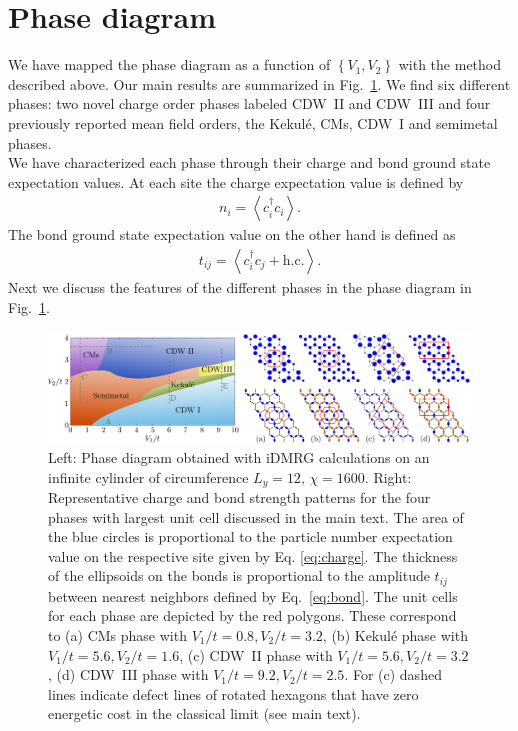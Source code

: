 \documentclass[aps,prx,10pt,twocolumn,floatfix,superscriptaddress,showpacs,numerical,footinbib]{revtex4-1}
\begin{document}
\section{\label{sec:phasediagram}Phase diagram}
%
We have mapped the phase diagram as a function of $\left\lbrace V_{1},V_{2}\right\rbrace$ with the method described above.
%
Our main results are summarized in Fig.~\ref{fig:phase diagram}.
%
We find six different phases: two novel charge order phases labeled CDW~II and CDW~III and four previously 
reported mean field orders, the Kekul\'{e}, CMs, CDW~I and semimetal phases.\\
%
We have characterized each phase through their charge and bond ground state
expectation values.
%
At each site the charge expectation value is defined by 
%
\begin{eqnarray}
\label{eq:charge}
n_{i}=\left\langle c^{\dagger}_{i}c_{i}\right\rangle.
\end{eqnarray}
%
The bond ground state expectation value on the other hand is defined as
%
\begin{eqnarray}
\label{eq:bond}
t_{ij}=\left\langle c^{\dagger}_{i}c_{j}+\mathrm{h.c.}\right\rangle.
\end{eqnarray}
%
Next we discuss the features of the different phases in the phase diagram in Fig.~\ref{fig:phase diagram}.


\begin{figure}
 \includegraphics[width=\textwidth]{pdf/phase_diagram_ext.pdf}
 \caption{Left: Phase diagram obtained with iDMRG calculations on an infinite cylinder of circumference $L_{y}=12, \, \chi = 1600$. 
 Right: Representative charge and bond strength patterns for the four phases with largest unit cell discussed in the main text. 
 The area of the blue circles is proportional to the particle number expectation value on the respective site given by Eq. \eqref{eq:charge}. 
 The thickness of the ellipsoids on the bonds is proportional to the amplitude $t_{ij}$ between nearest neighbors defined by Eq.~\eqref{eq:bond}.
 The unit cells for each phase are depicted by the red polygons. 
 These correspond to (a) CMs phase with $V_1/t = 0.8, V_2/t = 3.2 $, (b) Kekul\'e phase with $V_1/t = 5.6, V_2/t = 1.6 $, (c) CDW~II phase with $V_1/t = 5.6, V_2/t = 3.2$,  
 (d) CDW~III phase with $V_1/t = 9.2, V_2/t = 2.5$. 
 For (c) dashed lines indicate defect lines of rotated hexagons that have zero energetic cost in the classical limit (see main text).
 \label{fig:phase diagram}}
\end{figure}
\end{document}
